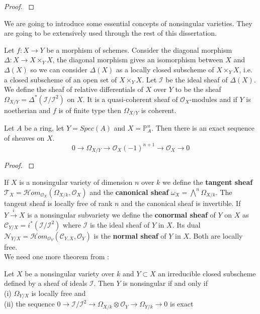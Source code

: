 \documentclass[
	oldfontcommands,
	sumario=abnt-6027-2012,
	12pt,			%
	openright,		%
	oneside,		%
	a4paper,		%
	english,		%
	brazil			%
	]{imecc-unicamp}
\begin{document}
\begin{proof}
	\cite[Okonek, Schneider \& Spindler, Lemma 1.1.4]{Okonek}
\end{proof}
We are going to introduce some essential concepts of nonsingular varieties. They are going to be extensively used through the rest of this dissertation.
\begin{definition}
Let $f:X \to Y$ be a morphism of schemes. Consider the diagonal morphism $\Delta: X \to X \times_Y X$, the diagonal morphism gives an isomorphism between $X$ and $\Delta(X)$ so we can consider $\Delta(X)$ as a locally closed subscheme of $X \times_Y X$, i.e. a closed subscheme of an open set of $X \times_Y X$. Let $\mathcal{I}$ be the ideal sheaf of $\Delta(X)$. We define the sheaf of relative differentials of $X$ over $Y$ to be the sheaf $\Omega_{X/Y}=\Delta^* (\mathcal{I}/\mathcal{I}^2)$ on $X$. It is a quasi-coherent sheaf of $\mathcal{O}_X$-modules and if $Y$ is noetherian and $f$ is of finite type then $\Omega_{X/Y}$ is coherent.
\end{definition}
\begin{proposition}
Let $A$ be a ring, let $Y=Spec(A)$ and $X=\mathbb{P}^n_A$. Then there is an exact sequence of sheaves on $X$.
\begin{equation}
0 \to \Omega_{X/Y} \to \mathcal{O}_X(-1)^{n+1} \to \mathcal{O}_X \to 0
\end{equation}
\end{proposition}
\begin{proof}
\cite[Hartshorne, Theorem II.8.13]{hartshorne_2010}
\end{proof}
If $X$ is a nonsingular variety of dimension $n$ over $k$ we define the \textbf{tangent sheaf} $\mathcal{T}_X=\mathcal{H}om_{\mathcal{O}_X}(\Omega_{X/k},\mathcal{O}_X)$ and the \textbf{canonical sheaf} $\omega_X=\bigwedge^n \Omega_{X/k}$. The tangent sheaf is locally free of rank $n$ and the canonical sheaf is invertible. If $Y \overset{i}{\to}X$ is a nonsingular subvariety we define the \textbf{conormal sheaf} of $Y$ on $X$ as $\mathcal{C}_{Y/X}=i^*(\mathcal{I}/\mathcal{I}^2)$ where $\mathcal{I}$ is the ideal sheaf of $Y$ in $X$. Its dual $\mathcal{N}_{Y/X}=\mathcal{H}om_{\mathcal{O}_Y}(\mathcal{C}_{Y,X},\mathcal{O}_Y)$ is the \textbf{normal sheaf} of $Y$ in $X$. Both are locally free.\\
We need one more theorem from \cite[Hartshorne]{hartshorne_2010}:
\begin{theorem}\label{nonsing}
Let $X$ be a nonsingular variety over $k$ and $Y\subset X$ an irreducible closed subscheme defined by a sheaf of ideals $\mathcal{I}$. Then $Y$ is nonsingular if and only if\\
(i) $\Omega_{Y/X}$ is locally free and\\
(ii) the sequence $0 \to \mathcal{I}/\mathcal{I}^2 \to \Omega_{X/k} \otimes \mathcal{O}_Y \to \Omega_{Y/k} \to 0$ is exact
\end{theorem}
\end{document}
